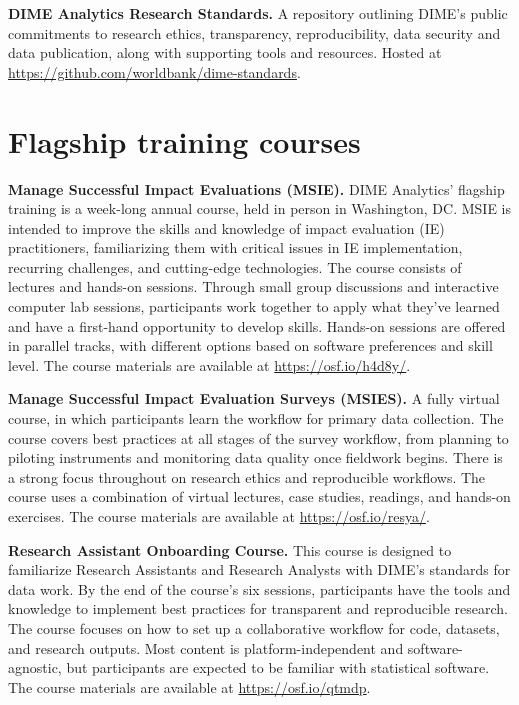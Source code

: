 \documentclass[
]{book}
\begin{document}
\textbf{DIME Analytics Research Standards.} A repository outlining DIME's public commitments to research ethics, transparency, reproducibility, data security and data publication, along with supporting tools and resources.
Hosted at \url{https://github.com/worldbank/dime-standards}.

\hypertarget{flagship-training-courses}{%
\section*{Flagship training courses}\label{flagship-training-courses}}

\textbf{Manage Successful Impact Evaluations (MSIE).}
DIME Analytics' flagship training is a week-long annual course,
held in person in Washington, DC. MSIE is intended to improve the skills and knowledge of impact evaluation (IE) practitioners,
familiarizing them with critical issues in IE implementation,
recurring challenges, and cutting-edge technologies.
The course consists of lectures and hands-on sessions.
Through small group discussions and interactive computer lab sessions,
participants work together to apply what they've learned and have a first-hand opportunity to develop skills.
Hands-on sessions are offered in parallel tracks,
with different options based on software preferences and skill level.
The course materials are available at \url{https://osf.io/h4d8y/}.

\textbf{Manage Successful Impact Evaluation Surveys (MSIES).}
A fully virtual course, in which participants learn the workflow for primary data collection.
The course covers best practices at all stages of the survey workflow,
from planning to piloting instruments and monitoring data quality once fieldwork begins.
There is a strong focus throughout on research ethics and reproducible workflows.
The course uses a combination of virtual lectures,
case studies, readings, and hands-on exercises.
The course materials are available at \url{https://osf.io/resya/}.

\textbf{Research Assistant Onboarding Course.}
This course is designed to familiarize Research Assistants and Research Analysts with DIME's standards for data work.
By the end of the course's six sessions,
participants have the tools and knowledge to implement best practices for transparent and reproducible research.
The course focuses on how to set up a collaborative workflow for code,
datasets, and research outputs.
Most content is platform-independent and software-agnostic,
but participants are expected to be familiar with statistical software.
The course materials are available at \url{https://osf.io/qtmdp}.
\end{document}
